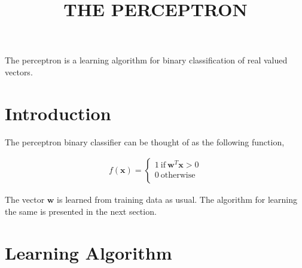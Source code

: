 \documentclass[11pt, a4paper]{article}
\begin{document}
\title{THE PERCEPTRON}
\date{}
\maketitle

The perceptron is a learning algorithm for binary classification of real valued vectors. 

\section{Introduction}

The perceptron binary classifier can be thought of as the following function,

\begin{align*}
	f(\boldsymbol{x}) = \left\{                       
	\begin{array}{ll}                                 
	1\ \text{if}\ \boldsymbol{w}^T \boldsymbol{x} > 0 \\
	0\ \text{otherwise}                               \\
	\end{array}                                       
	\right.                                           
\end{align*}

The vector $\boldsymbol{w}$ is learned from training data as usual. The algorithm for learning the same is presented in the next section. 

\section{Learning Algorithm}
	
\end{document}
